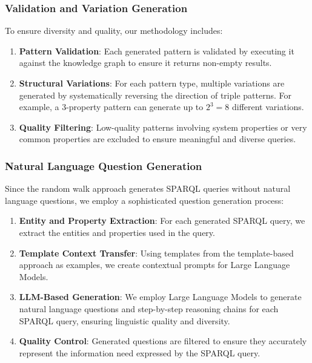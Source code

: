 \subsubsection{Validation and Variation Generation}
To ensure diversity and quality, our methodology includes:

\begin{enumerate}
    \item \textbf{Pattern Validation}: Each generated pattern is validated by executing it against the knowledge graph to ensure it returns non-empty results.
    
    \item \textbf{Structural Variations}: For each pattern type, multiple variations are generated by systematically reversing the direction of triple patterns. For example, a 3-property pattern can generate up to $2^3 = 8$ different variations.
    
    \item \textbf{Quality Filtering}: Low-quality patterns involving system properties or very common properties are excluded to ensure meaningful and diverse queries.
\end{enumerate}

\subsubsection{Natural Language Question Generation}
Since the random walk approach generates SPARQL queries without natural language questions, we employ a sophisticated question generation process:

\begin{enumerate}
    \item \textbf{Entity and Property Extraction}: For each generated SPARQL query, we extract the entities and properties used in the query.
    
    \item \textbf{Template Context Transfer}: Using templates from the template-based approach as examples, we create contextual prompts for Large Language Models.
    
    \item \textbf{LLM-Based Generation}: We employ Large Language Models to generate natural language questions and step-by-step reasoning chains for each SPARQL query, ensuring linguistic quality and diversity.
    
    \item \textbf{Quality Control}: Generated questions are filtered to ensure they accurately represent the information need expressed by the SPARQL query.
\end{enumerate}

